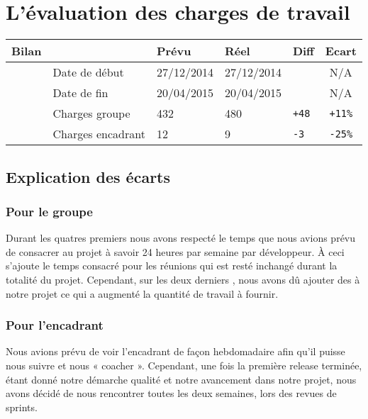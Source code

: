 \section{L'évaluation des charges de travail}
\begin{tabular}{|l|p{2.6cm}|p{2.6cm}|p{2.3cm}|p{2.3cm}|c|}
	\hline
	\textbf{Bilan} & & \textbf{Prévu} & \textbf{Réel} & \textbf{Diff}& \textbf{Ecart}\\
	\hline
	& Date de début &27/12/2014 &27/12/2014&&N/A\\
	\hline
	& Date de fin &20/04/2015 &20/04/2015&&N/A\\
	\hline
	& Charges groupe &432 &480&\texttt{+48}&\texttt{+11\%}\\
	\hline
	& Charges encadrant &12 &9&\texttt{-3}&\texttt{-25\%}\\
	\hline
\end{tabular}

\subsection{Explication des écarts}
\subsubsection{Pour le groupe}
Durant les quatres premiers \Sprints{} nous avons respecté le temps que nous avions prévu de consacrer au projet à savoir 24 heures par semaine par
développeur. À ceci s'ajoute le temps consacré pour les réunions qui est resté inchangé durant la totalité du projet. Cependant, sur les deux derniers
\Sprints, nous
avons dû ajouter des \Stories{} à notre projet ce qui a augmenté la quantité de travail à fournir.

\subsubsection{Pour l'encadrant}
Nous avions prévu de voir l'encadrant de façon hebdomadaire afin qu'il puisse nous suivre et nous « coacher ». Cependant, une fois la première release
terminée, étant donné notre démarche qualité et notre avancement dans notre projet, nous avons décidé de nous rencontrer toutes les deux semaines, lors
des revues de sprints.


